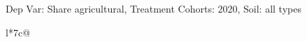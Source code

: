 \begin{table}[H]
\captionlistentry[table]{}
\label{table:beaver_land_class_DVis_land_class_1_SCg3_SSall_soil}
\scriptsize %
Dep Var: Share agricultural, Treatment Cohorts: 2020, Soil: all types \\
\begin{threeparttable}
\begin{tabulary}{\textwidth}{l*{7}{c}@{}}
\toprule \toprule
\noalign{\smallskip}
\noalign{\smallskip}
\midrule \bottomrule
\end{tabulary}
\medskip
\end{threeparttable}
\end{table}
